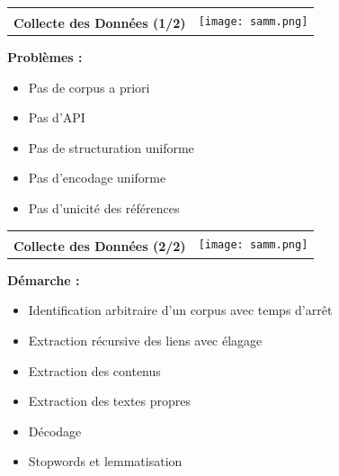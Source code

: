 \documentclass[12pt]{beamer}
\author{}
\date{}
\begin{document}
\begin{frame}
\begin{tabular}{b{7cm}l}
& \multirow{2}{*}{\texttt{[image: samm.png]}}\\ {\large \textbf{Collecte des Données (1/2)}}& 
\end{tabular}

\vspace{1.5cm}

\textbf{Problèmes :}\\

\vspace{0.5cm}
\begin{itemize}
	\item Pas de corpus a priori
	\item Pas d'API
	\item Pas de structuration uniforme
	\item Pas d'encodage uniforme
	\item Pas d'unicité des références
\end{itemize}


\end{frame}

\begin{frame}
\begin{tabular}{b{7cm}l}
& \multirow{2}{*}{\texttt{[image: samm.png]}}\\ {\large \textbf{Collecte des Données (2/2)}}& 
\end{tabular}

\vspace{1.5cm}

\textbf{Démarche :}\\

\vspace{0.5cm}
\begin{itemize}
	\item Identification arbitraire d'un corpus avec temps d'arrêt
	\item Extraction récursive des liens avec élagage
	\item Extraction des contenus
	\item Extraction des textes propres
	\item Décodage
	\item Stopwords et lemmatisation
\end{itemize}

\end{frame}
\end{document}
